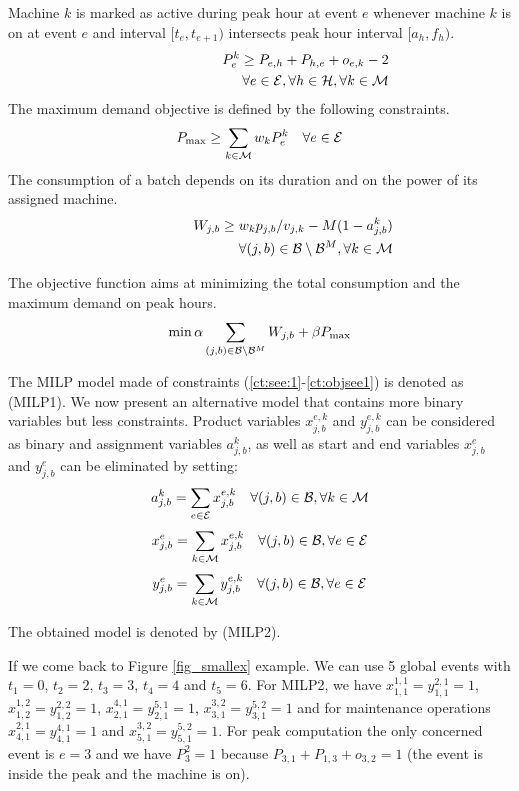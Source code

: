 Machine $k$ is marked as active during peak hour at event $e$ whenever
machine $k$ is on at event $e$ and interval $[t_e,t_{e+1})$ intersects
  peak hour interval $[a_h,f_h)$.
\begin{eqnarray}
P_{e}^k\geq P_{e,h}+P_{h,e}+o_{e,k}-2\nonumber\\ \quad \quad \quad
\quad\quad \quad \quad \quad \forall e\in{\cal E},\forall h\in{\cal
  H},\forall k\in{\cal M}
\end{eqnarray}
The maximum demand objective is defined by the following constraints.
\begin{eqnarray}
P_{\max}\geq \sum_{k\in{\cal M}} w_kP_{e}^k\quad\forall e\in{\cal E}
\end{eqnarray}
The consumption of a batch depends on its duration and on the power of
its assigned machine.
\begin{eqnarray}
W_{j,b}\geq w_k p_{j,b} / v_{j,k} - M (1-a_{j,b}^k)\nonumber\\ \quad
\quad \quad \quad\quad \quad \quad \quad\forall (j,b)\in{\cal
  B}\setminus{\cal B}^M,\forall k\in{\cal M}
\end{eqnarray}

The objective function aims at minimizing the total consumption and
the maximum demand on peak hours.
\begin{eqnarray}
\min \alpha\sum_{(j,b)\in{\cal B}\setminus{\cal B}^M}W_{j,b} + \beta
P_{\max}\label{ct:objsee1}
\end{eqnarray}

The MILP model made of constraints (\ref{ct:see:1}-\ref{ct:objsee1})
is denoted as (MILP1). We now present an alternative model that
contains more binary variables but less constraints. Product variables
$x_{j,b}^{e,k}$ and $y_{j,b}^{e,k}$ can be considered as binary and
assignment variables $a^k_{j,b}$, as well as start and end variables
$x_{j,b}^e$ and $y_{j,b}^e$ can be eliminated by setting:
$$ a^k_{j,b}=\sum_{e\in{\cal E}}x_{j,b}^{e,k}\quad\forall(j,b)\in{\cal
  B},\forall k\in{\cal M}$$
$$ x_{j,b}^e=\sum_{k\in{\cal M}}x_{j,b}^{e,k}\quad\forall(j,b)\in{\cal
  B},\forall e\in{\cal E}$$
$$ y_{j,b}^e=\sum_{k\in{\cal M}}y_{j,b}^{e,k}\quad\forall(j,b)\in{\cal
  B},\forall e\in{\cal E}$$

The obtained model is denoted by (MILP2).

If we come back to Figure \ref{fig_smallex} example. We can use 5
global events with $t_1=0$, $t_2=2$, $t_3=3$, $t_4=4$ and $t_5=6$. For
MILP2, we have $x_{1,1}^{1,1}=y_{1,1}^{2,1}=1$,
$x_{1,2}^{1,2}=y_{1,2}^{2,2}=1$, $x_{2,1}^{4,1}=y_{2,1}^{5,1}=1$,
$x_{3,1}^{3,2}=y_{3,1}^{5,2}=1$ and for maintenance operations
$x_{4,1}^{2,1}=y_{4,1}^{4,1}=1$ and
$x_{5,1}^{3,2}=y_{5,1}^{5,2}=1$. For peak computation the only
concerned event is $e=3$ and we have $P_3^2=1$ because
$P_{3,1}+P_{1,3}+o_{3,2}=1$ (the event is inside the peak and the
machine is on).

